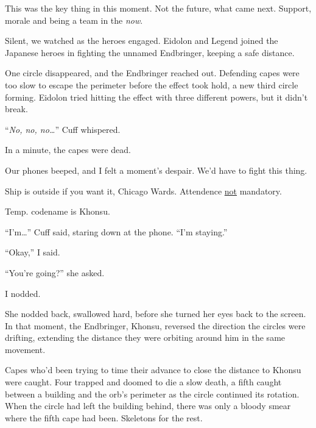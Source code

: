 This was the key thing in this moment.  Not the future, what came next.  Support, morale and being a team in the \emph{now}.



Silent, we watched as the heroes engaged.  Eidolon and Legend joined the Japanese heroes in fighting the unnamed Endbringer, keeping a safe distance.



One circle disappeared, and the Endbringer reached out.  Defending capes were too slow to escape the perimeter before the effect took hold, a new third circle forming.  Eidolon tried hitting the effect with three different powers, but it didn't break.



``\emph{No, no, no\ldots}'' Cuff whispered.



In a minute, the capes were dead.



Our phones beeped, and I felt a moment's despair.  We'd have to fight this thing.



Ship is outside if you want it, Chicago Wards.  Attendence \underline{not} mandatory.



Temp. codename is Khonsu.



``I'm\ldots'' Cuff said, staring down at the phone.  ``I'm staying.''



``Okay,'' I said.



``You're going?'' she asked.



I nodded.



She nodded back, swallowed hard, before she turned her eyes back to the screen.  In that moment, the Endbringer, Khonsu, reversed the direction the circles were drifting, extending the distance they were orbiting around him in the same movement.



Capes who'd been trying to time their advance to close the distance to Khonsu were caught.  Four trapped and doomed to die a slow death, a fifth caught between a building and the orb's perimeter as the circle continued its rotation.  When the circle had left the building behind, there was only a bloody smear where the fifth cape had been.  Skeletons for the rest.



